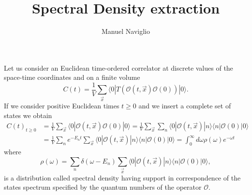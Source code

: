 \documentclass[a4paper,10pt]{article}
\begin{document}
\title{Spectral Density extraction}
\author{Manuel Naviglio}
\date{}
\maketitle

Let us consider an Euclidean time-ordered correlator at discrete values of the space-time coordinates and on a finite volume
\begin{equation}
C(t) = \frac{1}{V}\sum_{\vec{x}} \langle 0 | T( \mathcal{O}(t,\vec{x}) \mathcal{O}(0)) |0\rangle.
\end{equation}
If we consider positive Euclidean times $t \geq 0$ and we insert a complete set of states we obtain
\begin{equation}\begin{split}
C(t)_{t\geq0} &= \frac{1}{V}\sum_{\vec{x}} \langle 0 |  \mathcal{O}(t,\vec{x}) \mathcal{O}(0)|0\rangle  = \frac{1}{V}\sum_{\vec{x}} \sum_n \langle 0 |  \mathcal{O}(t,\vec{x}) |n\rangle \langle n | \mathcal{O}(0) |0\rangle \\& = \frac{1}{V} \sum_n  e^{-E_n t} \sum_{\vec{x}} \langle 0 |  \mathcal{O}(t,\vec{x}) |n\rangle \langle n | \mathcal{O}(0) |0\rangle = \int_0^\infty d \omega \rho(\omega) e^{-\omega t}
\end{split}\end{equation}
where 
\begin{equation}
\rho(\omega) = \sum_n \delta(\omega- E_n) \sum_{\vec{x}} \langle 0 |  \mathcal{O}(t,\vec{x}) |n\rangle \langle n | \mathcal{O}(0) |0\rangle, 
\end{equation}
is a distribution called spectral density having support in correspondence of the states spectrum specified by the quantum numbers of the operator $\mathcal{O}$. 
\end{document}
